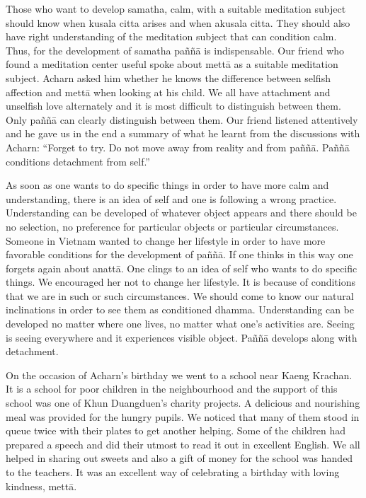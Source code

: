 {{{{{{{Those who want to develop samatha,
calm, with a suitable meditation subject should know when kusala citta
arises and when akusala citta. They should also have right understanding
of the meditation subject that can condition calm. Thus, for the
development of samatha paññā is indispensable. Our friend who found a
meditation center useful spoke about mettā as a suitable meditation
subject. Acharn asked him whether he knows the difference between
selfish affection and mettā when looking at his child. We all have
attachment and unselfish love alternately and it is most difficult to
distinguish between them. Only paññā can clearly distinguish between
them. Our friend listened attentively and he gave us in the end a
summary of what he learnt from the discussions with Acharn: ``Forget to
try. Do not move away from reality and from paññā. Paññā conditions
detachment from self.''

As soon as one wants to do specific
things in order to have more calm and understanding, there is an idea of
self and one is following a wrong practice. Understanding can be
developed of whatever object appears and there should be no selection,
no preference for particular objects or particular circumstances.
Someone in Vietnam wanted to change her lifestyle in order to have more
favorable conditions for the development of paññā. If one thinks in this
way one forgets again about anattā. One clings to an idea of self who
wants to do specific things. We encouraged her not to change her
lifestyle. It is because of conditions that we are in such or such
circumstances. We should come to know our natural inclinations in order
to see them as conditioned dhamma. Understanding can be developed no
matter where one lives, no matter what one's activities are. Seeing is
seeing everywhere and it experiences visible object. Paññā develops
along with detachment. 

On the occasion of Acharn's birthday we
went to a school near Kaeng Krachan. It is a school for poor children in
the neighbourhood and the support of this school was one of Khun
Duangduen's charity projects. A delicious and nourishing meal was
provided for the hungry pupils. We noticed that many of them stood in
queue twice with their plates to get another helping. Some of the
children had prepared a speech and did their utmost to read it out in
excellent English. We all helped in sharing out sweets and also a gift
of money for the school was handed to the teachers. It was an excellent
way of celebrating a birthday with loving kindness, mettā. 

}}}}}}}
